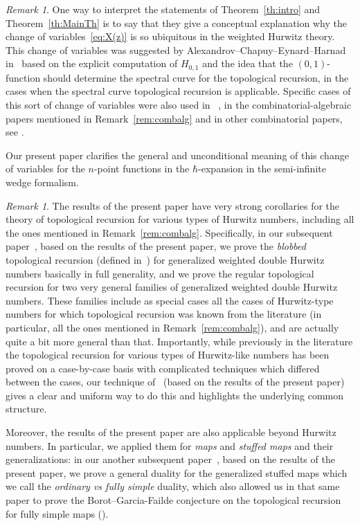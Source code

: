 \documentclass[JEP,XML,SOM,Unicode,NoEqCountersInSection,NoFloatCountersInSection]{cedram}
\theoremstyle{plain}
\theoremstyle{definition}
\theoremstyle{remark}
\newtheorem{remark}[theorem]{Remark}
\begin{document}
\begin{remark} One way to interpret the statements of Theorem~\ref{th:intro} and Theorem~\ref{th:MainTh} is to say that they give a conceptual explanation why the change of variables~\eqref{eq:X(z)} is so ubiquitous in the weighted Hurwitz theory. This change of variables was suggested by Alexandrov--Chapuy--Eynard--Harnad in~\cite{ACEH-1} based on the explicit computation of $H_{0,1}$ and the idea that the $(0,1)$-function should determine the spectral curve for the topological recursion, in the cases when the spectral curve topological recursion is applicable. Specific cases of this sort of change of variables were also used in ~\cite{ACEHferm}, in the combinatorial-algebraic papers mentioned in Remark~\ref{rem:combalg} and in other combinatorial papers, see \eg \cite{chapuy2009asymptotic}.

Our present paper clarifies the general and unconditional meaning of this change of variables for the $n$-point functions in the $\hbar$-expansion in the semi-infinite wedge formalism.
\end{remark}

\begin{remark}\label{rem:toprec}
The results of the present paper have very strong corollaries for the theory of topological recursion for various types of Hurwitz numbers, including all the ones mentioned in Remark~\ref{rem:combalg}. Specifically, in our subsequent paper~\cite{BDKS21toprec}, based on the results of the present paper, we prove the \emph{blobbed} topological recursion (defined in~\cite{BS17}) for generalized weighted double Hurwitz numbers basically in full generality, and we prove the regular topological recursion for two very general families of generalized weighted double Hurwitz numbers. These families include as special cases all the cases of Hurwitz-type numbers for which topological recursion was known from the literature (in particular, all the ones mentioned in Remark~\ref{rem:combalg}), and are actually quite a bit more general than that. Importantly, while previously in the literature the topological recursion for various types of Hurwitz-like numbers has been proved on a case-by-case basis with complicated techniques which differed between the cases, our technique of~\cite{BDKS21toprec} (based on the results of the present paper) gives a clear and uniform way to do this and highlights the underlying common structure.

Moreover, the results of the present paper are also applicable beyond Hurwitz numbers. In particular, we applied them for \emph{maps} and \emph{stuffed maps} and their generalizations: in our another subsequent paper~\cite{BDKS21fully}, based on the results of the present paper, we prove a general duality for the generalized stuffed maps which we call the \emph{ordinary vs fully simple} duality, which also allowed us in that same paper to prove the Borot--Garcia-Failde conjecture on the topological recursion for fully simple maps (\cite[Conj.\,5.3]{borot2018simple}).
\end{remark}
\end{document}
